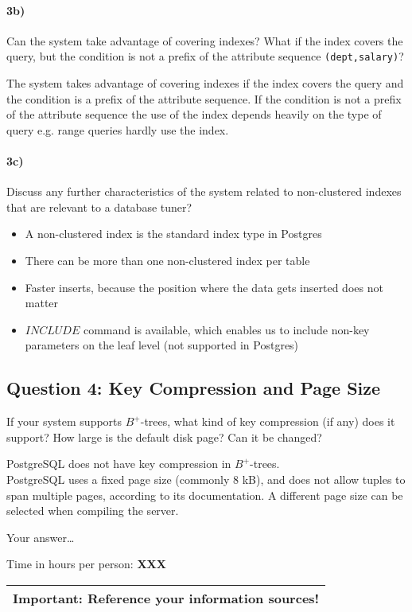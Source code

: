 \documentclass[11pt]{scrartcl}
\begin{document}
\paragraph{3b)} Can the system take advantage of covering indexes? What if the
index covers the query, but the condition is not a prefix of the
attribute sequence {\tt (dept,salary)}?

The system takes advantage of covering indexes if the index covers the query and the condition is a prefix of the attribute sequence. If the condition is not a prefix of the attribute sequence the use of the index depends heavily on the type of query e.g. range queries hardly use the index.

\paragraph{3c)} Discuss any further characteristics of the system related to
non-clustered indexes that are relevant to a database tuner?

\begin{itemize}
 \item A non-clustered index is the standard index type in Postgres
 \item There can be more than one non-clustered index per table
 \item Faster inserts, because the position where the data gets inserted does not matter
 \item $INCLUDE$ command is available, which enables us to include non-key parameters on the leaf level (not supported in Postgres)
\end{itemize}

\subsection*{Question 4: Key Compression and Page Size} If your system
supports $B^+$-trees, what kind of key compression (if any) does it
support?  How large is the default disk page? Can it be changed?

PostgreSQL does not have key compression in $B^+$-trees.\\
PostgreSQL uses a fixed page size (commonly 8 kB), and does not allow tuples to span multiple pages, according to its documentation.
A different page size can be selected when compiling the server.
\smallskip

Your answer\dots


\bigskip

\noindent Time in hours per person: {\bf XXX}

\bigskip

\begin{center}
  \begin{tabular}{c}
    \hline
    {\bf Important:} Reference your information sources!
    \\\hline
  \end{tabular}
\end{center}
\end{document}
